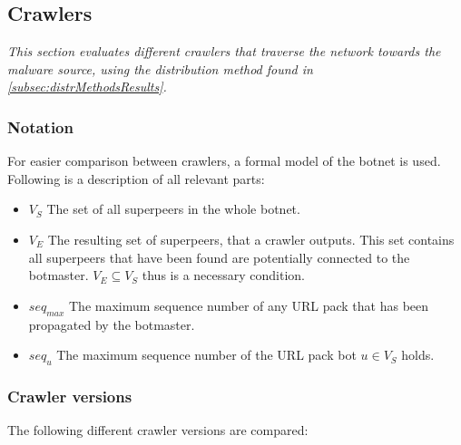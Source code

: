 \documentclass{article}
\begin{document}
\subsection{Crawlers} \label{sec:Crawlers}
\emph{This section evaluates different crawlers that traverse the network towards the malware source, using the distribution method found in \ref{subsec:distrMethodsResults}.}

\subsubsection*{Notation}
For easier comparison between crawlers, a formal model of the botnet is used. Following is a description of all relevant parts: 

\begin{itemize}
	\item  \textbf{$V_{S}$}  The set of all superpeers in the whole botnet.
	\item  \textbf{$V_{E}$}  The resulting set of superpeers, that a crawler outputs. This set contains all superpeers that have been found are potentially connected to the botmaster. $V_{E} \subseteq V_{S}$ thus is a necessary condition.
	 \item  \textbf{$seq_{max}$}  The maximum sequence number of any URL pack that has been propagated by the botmaster.
	 \item  \textbf{$seq_{u}$}  The maximum sequence number of the URL pack bot $u \in V_{S}$ holds.
\end{itemize}

\subsubsection{Crawler versions} \label{subsec:CrawlerVersions}
The following different crawler versions are compared:
\end{document}
